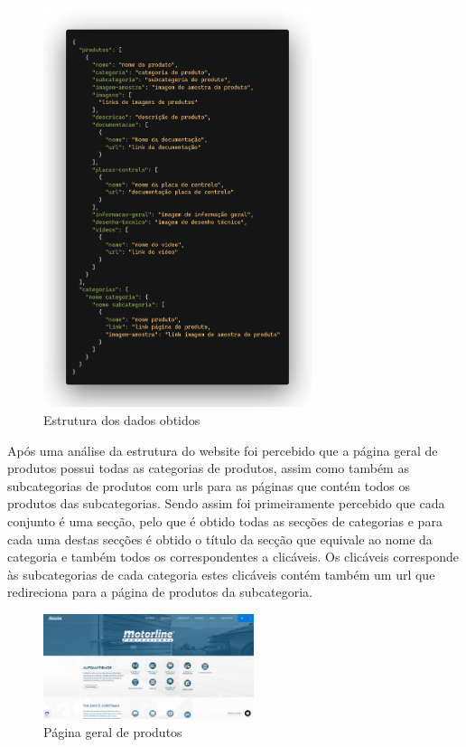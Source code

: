 \begin{figure}[htb]
    \centering
    
    \includegraphics[width=0.7\textwidth]{images/implementacao/scraper/estrutura_scraper.png}
    \caption{Estrutura dos dados obtidos}
    \label{fig:49}
\end{figure}

\newpage

Após uma análise da estrutura do website foi percebido que a página geral de produtos possui todas as categorias
de produtos, assim como também as subcategorias de produtos com urls para as páginas que contém todos os produtos
das subcategorias. Sendo assim foi primeiramente percebido que cada conjunto é uma secção, pelo que é obtido
todas as secções de categorias e para cada uma destas secções é obtido o título da secção que equivale ao nome da
categoria e também todos os correspondentes a clicáveis. Os clicáveis corresponde às subcategorias de cada categoria
estes clicáveis contém também um url que redireciona para a página de produtos da subcategoria.

\begin{figure}[htb]
    \centering
    
    \includegraphics[width=0.55\textwidth]{images/implementacao/scraper/pagina_geral_produtos.png}
    \caption{Página geral de produtos}
    \label{fig:50}
\end{figure}

